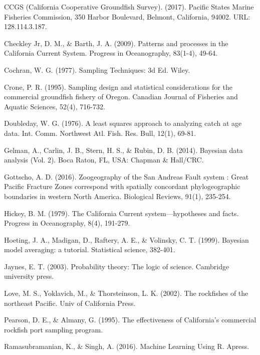 \documentclass[12pt]{article}
\begin{document}
%
\begin{thebibliography}{1}
%
 CCGS (California Cooperative Groundfish Survey). (2017). 
Pacific States Marine Fisheries Commission, 350 Harbor Boulevard, Belmont, 
California, 94002. URL:  128.114.3.187.

%
 Checkley Jr, D. M., \& Barth, J. A. (2009). Patterns and processes in 
the California Current System. Progress in Oceanography, 83(1-4), 49-64.

%
 Cochran, W. G. (1977). Sampling Techniques: 3d Ed. Wiley.

%
 Crone, P. R. (1995). Sampling design and statistical 
considerations for the commercial groundfish fishery of Oregon. Canadian 
Journal of Fisheries and Aquatic Sciences, 52(4), 716-732.

%
 Doubleday, W. G. (1976). A least squares approach to 
analyzing catch at age data. Int. Comm. Northwest Atl. Fish. Res. Bull, 12(1), 
69-81.

%
 Gelman, A., Carlin, J. B., Stern, H. S., \& Rubin, D. B. 
(2014). Bayesian data analysis (Vol. 2). Boca Raton, FL, USA: Chapman \& 
Hall/CRC.

%
 Gottscho, A. D. (2016). Zoogeography of the San Andreas Fault system
: Great Pacific Fracture Zones correspond with spatially concordant 
phylogeographic boundaries in western North America. Biological Reviews, 91(1), 
235-254.

%
 Hickey, B. M. (1979). The California Current 
system—hypotheses and facts. Progress in Oceanography, 8(4), 191-279.

%
 Hoeting, J. A., Madigan, D., Raftery, A. E., \& Volinsky, C. T. 
(1999). Bayesian model averaging: a tutorial. Statistical science, 382-401.

%
 Jaynes, E. T. (2003). Probability theory: The logic of 
science. Cambridge university press.

%
 Love, M. S., Yoklavich, M., \& Thorsteinson, L. K. (2002). The 
rockfishes of the northeast Pacific. Univ of California Press.

%
 Pearson, D. E., \& Almany, G. (1995). The effectiveness of 
California's commercial rockfish port sampling program.

%
 Ramasubramanian, K., \& Singh, A. (2016). Machine Learning 
Using R. Apress.


\end{thebibliography}
\end{document}

